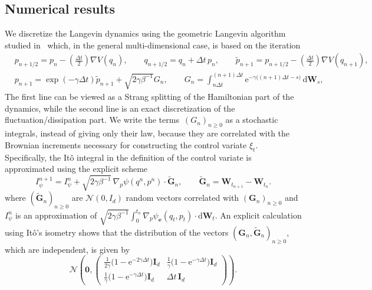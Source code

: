 \documentclass[11pt,a4paper]{article}
\newcommand{\e}{\mathrm{e}}
\newcommand{\grad}{\nabla}
\newcommand{\vect}[1]{\boldsymbol{\mathbf #1}}
\newcommand{\mat}[1]{\vect #1}
\renewcommand{\d}{\mathrm d}
\theoremstyle{plain}
\numberwithin{equation}{section}
\renewcommand{\geq}{\geqslant}
\begin{document}
\subsection{Numerical results}%
We discretize the Langevin dynamics using the geometric Langevin algorithm studied in~\cite{MR2608370} which,
in the general multi-dimensional case, is based on the iteration
\begin{align*}
    & p_{n+1/2} = p_n - \left(\frac{\Delta t}{2}\right) \grad V(q_n),
    \qquad q_{n+1/2} = q_n + \Delta t \, p_n,
    \qquad \widetilde p_{n+1} = p_{n+1/2} - \left(\frac{\Delta t}{2}\right) \grad V(q_{n+1}), \\
    & p_{n+1} = \exp \left(- \gamma \Delta t \right) \widetilde p_{n+1}
    + \sqrt{2 \gamma \beta^{-1}} G_n, \qquad G_n = \int_{n \Delta t}^{(n+1)\Delta t} \e^{-\gamma \bigl((n+1)\Delta t-s\bigr)} \, \d \vect W_s,
\end{align*}
The first line can be viewed as a Strang splitting of the Hamiltonian part of the dynamics,
while the second line is an exact discretization of the fluctuation/dissipation part.
We write the terms~$(G_n)_{n\geq0}$ as a stochastic integrals, instead of giving only their law,
because they are correlated with the Brownian increments necessary for constructing the control variate $\xi_t$.
Specifically, the It\^o integral in the definition of the control variate is approximated using the explicit scheme
\[
    I_{\psi}^{n+1} = I_{\psi}^n + \sqrt{2 \gamma \beta^{-1}} \, \grad_p \psi(q^{n}, p^{n}) \cdot
    \widetilde {\vect G}_n, \qquad \widetilde {\vect G}_n = \vect W_{t_{n+1}} - \vect W_{t_n}.
\]
where $(\widetilde {\vect G}_n)_{n \geq 0}$ are $\mathcal N(0, I_d)$ random vectors correlated with $(\vect G_n)_{n \geq 0}$
and $I_{\psi}^{n}$ is an approximation of $\sqrt{2 \gamma \beta^{-1}} \int_{0}^{t_n} \grad_p \psi_{\vect e}(q_t, p_t) \cdot \d \vect W_t$.
An explicit calculation using It\^o's isometry shows that the distribution of the vectors $(\vect G_n, \widetilde {\vect G}_n)_{n \geq 0}$,
which are independent, is given by
\[
    \mathcal N
    \left(\vect 0,
        \begin{pmatrix}
            \frac{1}{2 \gamma} \bigl(1 - \e^{-2 \gamma \Delta t}\bigr) \mat I_d & \frac{1}{\gamma}\bigl(1 - \e^{-\gamma \Delta t}\bigr) \mat I_d \\
            \frac{1}{\gamma}\bigl(1 - \e^{-\gamma \Delta t}\bigr) \mat I_d & \Delta t \, \mat I_d
        \end{pmatrix}
    \right).
\]
\end{document}
